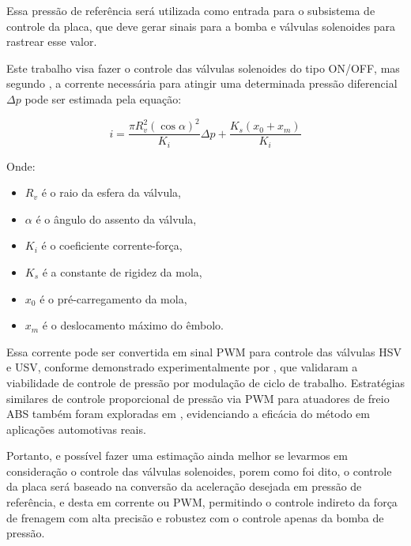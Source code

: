 Essa pressão de referência será utilizada como entrada para o subsistema de controle da placa, que deve gerar sinais para a bomba e válvulas solenoides para rastrear esse valor.

Este trabalho visa fazer o controle das válvulas solenoides do tipo ON/OFF, mas segundo  , a corrente necessária para atingir uma determinada pressão diferencial $\Delta p$ pode ser estimada pela equação:

\begin{equation}
i = \frac{\pi R_v^2 (\cos \alpha)^2}{K_i} \Delta p + \frac{K_s (x_0 + x_m)}{K_i}
\end{equation}

Onde:
\begin{itemize}
 \item $R_v$ é o raio da esfera da válvula,
 \item $\alpha$ é o ângulo do assento da válvula,
 \item $K_i$ é o coeficiente corrente-força,
 \item $K_s$ é a constante de rigidez da mola,
 \item $x_0$ é o pré-carregamento da mola,
 \item $x_m$ é o deslocamento máximo do êmbolo.
\end{itemize}

Essa corrente pode ser convertida em sinal PWM para controle das válvulas HSV e USV, conforme demonstrado experimentalmente por , que validaram a viabilidade de controle de pressão por modulação de ciclo de trabalho.  Estratégias similares de controle proporcional de pressão via PWM para atuadores de freio ABS também foram exploradas em , evidenciando a eficácia do método em aplicações automotivas reais.

Portanto, e possível fazer uma estimação ainda melhor se levarmos em consideração o controle das válvulas solenoides, porem como foi dito, o controle da placa será baseado na conversão da aceleração desejada em pressão de referência, e desta em corrente ou PWM, permitindo o controle indireto da força de frenagem com alta precisão e robustez com o controle apenas da bomba de pressão.


